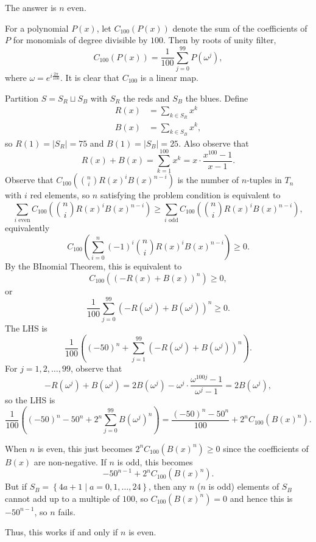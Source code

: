 The answer is $\boxed{n\text{ even}}$.

For a polynomial $P\left(x\right)$, let $C_{100}\left(P\left(x\right)\right)$ denote the sum of the coefficients of $P$ for monomials of degree divisible by $100$. Then by roots of unity filter, \[C_{100}\left(P\left(x\right)\right)=\frac{1}{100}\displaystyle\sum_{j=0}^{99}P\left(\omega^j\right),\] where $\omega=e^{i\frac{2\pi}{100}}$. It is clear that $C_{100}$ is a linear map.

Partition $S=S_R\sqcup S_B$ with $S_R$ the reds and $S_B$ the blues. Define
\begin{align*}
	R\left(x\right)&=\displaystyle\sum_{k\in S_R}x^k\\
	B\left(x\right)&=\displaystyle\sum_{k\in S_B}x^k,
\end{align*}
so $R\left(1\right)=\left|S_R\right|=75$ and $B\left(1\right)=\left|S_B\right|=25$. Also observe that \[R\left(x\right)+B\left(x\right)=\displaystyle\sum_{k=1}^{100}x^k=x\cdot\frac{x^{100}-1}{x-1}.\] Observe that $C_{100}\left(\binom{n}{i}R\left(x\right)^iB\left(x\right)^{n-i}\right)$ is the number of $n$-tuples in $T_n$ with $i$ red elements, so $n$ satisfying the problem condition is equivalent to \[\displaystyle\sum_{i\text{ even}}C_{100}\left(\binom{n}{i}R\left(x\right)^iB\left(x\right)^{n-i}\right)\geq\displaystyle\sum_{i\text{ odd}}C_{100}\left(\binom{n}{i}R\left(x\right)^iB\left(x\right)^{n-i}\right),\] equivalently \[C_{100}\left(\displaystyle\sum_{i=0}^n\left(-1\right)^i\binom{n}{i}R\left(x\right)^iB\left(x\right)^{n-i}\right)\geq0.\] By the BInomial Theorem, this is equivalent to \[C_{100}\left(\left(-R\left(x\right)+B\left(x\right)\right)^n\right)\geq0,\] or \[\frac{1}{100}\displaystyle\sum_{j=0}^{99}\left(-R\left(\omega^j\right)+B\left(\omega^j\right)\right)^n\geq0.\] The LHS is \[\frac{1}{100}\left(\left(-50\right)^n+\displaystyle\sum_{j=1}^{99}\left(-R\left(\omega^j\right)+B\left(\omega^j\right)\right)^n\right).\] For $j=1,2,\ldots,99$, observe that \[-R\left(\omega^j\right)+B\left(\omega^j\right)=2B\left(\omega^j\right)-\omega^j\cdot\frac{\omega^{100j}-1}{\omega^j-1}=2B\left(\omega^j\right),\] so the LHS is \[\frac{1}{100}\left(\left(-50\right)^n-50^n+2^n\displaystyle\sum_{j=0}^{99}B\left(\omega^j\right)^n\right)=\frac{\left(-50\right)^n-50^n}{100}+2^nC_{100}\left(B\left(x\right)^n\right).\]

When $n$ is even, this just becomes $2^nC_{100}\left(B\left(x\right)^n\right)\geq0$ since the coefficients of $B\left(x\right)$ are non-negative. If $n$ is odd, this becomes \[-50^{n-1}+2^nC_{100}\left(B\left(x\right)^n\right).\] But if $S_B=\left\{4a+1\mid a=0,1,\ldots,24\right\}$, then any $n$ ($n$ is odd) elements of $S_B$ cannot add up to a multiple of $100$, so $C_{100}\left(B\left(x\right)^n\right)=0$ and hence this is $-50^{n-1}$, so $n$ fails.

Thus, this works if and only if $n$ is even.